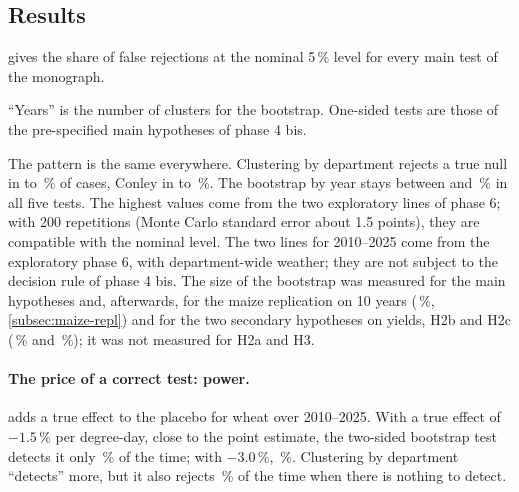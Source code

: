 \subsection{Results}

 gives the share of false rejections at the nominal 5\,\% level for every main test of the monograph.

\begin{table}[H]
\centering
\small
\caption{False rejection rate (\%) at the nominal 5\,\% level, placebo with years permuted}
\label{tab:sizes}
\begin{threeparttable}
{\setlength{\tabcolsep}{4pt}}
\begin{tablenotes}\footnotesize
\item ``Years'' is the number of clusters for the bootstrap. One-sided tests are those of the pre-specified main hypotheses of phase 4 bis.
\end{tablenotes}
\end{threeparttable}
\end{table}

The pattern is the same everywhere. Clustering by department rejects a true null in \SizeDepMin{} to \SizeDepMax\,\% of cases, Conley in \SizeConleyMin{} to \SizeConleyMax\,\%. The bootstrap by year stays between \SizeWcrMin{} and \SizeWcrMax\,\% in all five tests. The highest values come from the two exploratory lines of phase 6; with 200 repetitions (Monte Carlo standard error about 1.5 points), they are compatible with the nominal level. The two lines for 2010--2025 come from the exploratory phase 6, with department-wide weather; they are not subject to the decision rule of phase 4 bis. The size of the bootstrap was measured for the main hypotheses and, afterwards, for the maize replication on 10 years (\ReplSize\,\%, \cref{subsec:maize-repl}) and for the two secondary hypotheses on yields, H2b and H2c (\HtwobSize\,\% and \HtwocSize\,\%); it was not measured for H2a and H3.

\paragraph{The price of a correct test: power.}  adds a true effect to the placebo for wheat over 2010--2025. With a true effect of $-1.5$\,\% per degree-day, close to the point estimate, the two-sided bootstrap test detects it only \WheatPowerWCR\,\% of the time; with $-3.0$\,\%, \WheatPowerWCRDouble\,\%. Clustering by department ``detects'' more, but it also rejects \WheatSizeDep\,\% of the time when there is nothing to detect.

